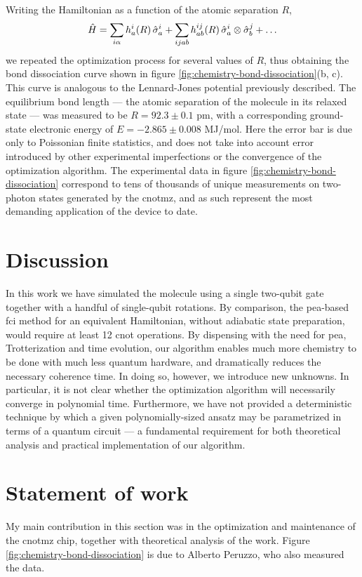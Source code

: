 Writing the \hehplus Hamiltonian as a function of the atomic separation $R$, 
\begin{equation}
    \hat{H} = 
    \sum_{i\alpha} h_a ^ i (R) \, \hat{\sigma}_a ^ i +
    \sum_{i j a b} h_{a b} ^ {ij} (R) \, \hat{\sigma}_a^i \otimes \hat{\sigma}_b^j + 
    \ldots
\end{equation}
we repeated the optimization process for several values of $R$, thus obtaining the bond dissociation curve shown in figure \ref{fig:chemistry-bond-dissociation}(b, c). This curve is analogous to the Lennard-Jones potential previously described. The equilibrium bond length --- the atomic separation of the molecule in its relaxed state --- was measured to be $R = 92.3 \pm 0.1$ pm, with a corresponding ground-state electronic energy of $E = -2.865\pm0.008$ MJ/mol. Here the error bar is due only to Poissonian finite statistics, and does not take into account error introduced by other experimental imperfections or the convergence of the optimization algorithm. The experimental data in figure \ref{fig:chemistry-bond-dissociation} correspond to tens of thousands of unique measurements on two-photon states generated by the \acrshort{cnotmz}, and as such represent the most demanding application of the device to date.

\section{Discussion} 
In this work we have simulated the \hehplus molecule using a single two-qubit gate together with a handful of single-qubit rotations. By comparison, the \gls{pea}-based \gls{fci} method for an equivalent Hamiltonian, without adiabatic state preparation, would require at least 12 \acrshort{cnot} operations. By dispensing with the need for \gls{pea}, Trotterization and time evolution, our algorithm enables much more chemistry to be done with much less quantum hardware, and dramatically reduces the necessary coherence time. In doing so, however, we introduce new unknowns. 
In particular, it is not clear whether the optimization algorithm will necessarily converge in polynomial time. Furthermore, we have not provided a deterministic technique by which a given polynomially-sized ansatz may be parametrized in terms of a quantum circuit --- a fundamental requirement for both theoretical analysis and practical implementation of our algorithm.


\section*{Statement of work}
My main contribution in this section was in the optimization and maintenance of the \gls{cnotmz} chip, together with theoretical analysis of the work. Figure \ref{fig:chemistry-bond-dissociation} is due to Alberto Peruzzo, who also measured the data.



